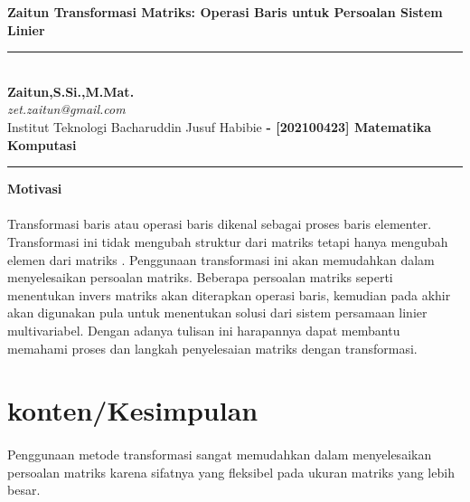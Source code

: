 \documentclass{article}   %
\newcommand{\judul}{Zaitun Transformasi Matriks: Operasi Baris untuk Persoalan Sistem Linier}
\newcommand{\nama}{Zaitun}
\newcommand{\matkul}{[202100423] Matematika Komputasi}
\newcommand{\asosiasi}{Institut Teknologi Bacharuddin Jusuf Habibie}
\begin{document}
\thispagestyle{empty}
\begin{center}
    \vspace{.4cm}
    \textsf{\textbf { \large \judul}}
\end{center}
\vspace{.4cm}
\hrule
	\textsf{\\
		\textbf{\nama,S.Si.,M.Mat.} \hspace{\fill}
		\textit{\large }\\ [0.7ex]
		\textit{zet.zaitun@gmail.com} \hspace{\fill} \textbf{}\\ [0.7ex]
		\asosiasi \hspace{\fill} \textbf{- \matkul }} \\
	\hrule
\vspace{.4cm}
\begin{center}
\textbf{\Large Motivasi}
\end{center}
\paragraph*{} 
Transformasi baris atau operasi baris dikenal sebagai proses baris elementer. Transformasi ini tidak mengubah struktur dari matriks tetapi hanya mengubah elemen dari matriks \textbf{\cite{zz}}. Penggunaan transformasi ini akan memudahkan dalam menyelesaikan persoalan matriks. Beberapa persoalan matriks seperti menentukan invers matriks akan diterapkan operasi baris, kemudian pada akhir akan digunakan pula untuk menentukan solusi dari sistem persamaan linier multivariabel. Dengan adanya tulisan ini harapannya dapat membantu memahami proses dan langkah penyelesaian matriks dengan transformasi.




\section{konten/Kesimpulan}
\paragraph*{} Penggunaan metode transformasi sangat memudahkan dalam menyelesaikan persoalan matriks karena sifatnya yang fleksibel pada ukuran matriks yang lebih besar. 



\end{document}
